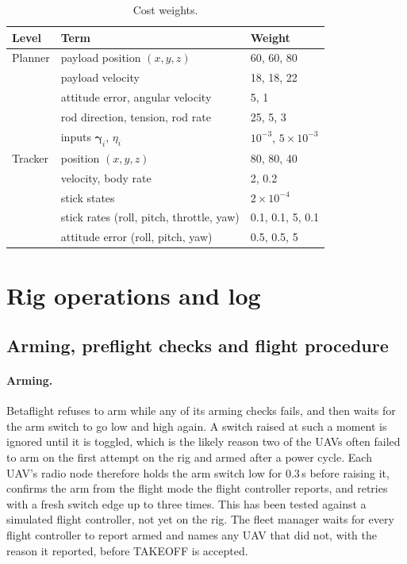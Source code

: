 \begin{table}[h]
\centering
\caption{Cost weights.}
\label{tab:weights}
\begin{tabular}{lll}
\toprule
Level & Term & Weight \\
\midrule
Planner & payload position $(x, y, z)$ & 60, 60, 80 \\
        & payload velocity & 18, 18, 22 \\
        & attitude error, angular velocity & 5, 1 \\
        & rod direction, tension, rod rate & 25, 5, 3 \\
        & inputs $\boldsymbol{\gamma}_i$, $\eta_i$ & $10^{-3}$, $5\times10^{-3}$ \\
\midrule
Tracker & position $(x, y, z)$ & 80, 80, 40 \\
        & velocity, body rate & 2, 0.2 \\
        & stick states & $2\times10^{-4}$ \\
        & stick rates (roll, pitch, throttle, yaw) & 0.1, 0.1, 5, 0.1 \\
        & attitude error (roll, pitch, yaw) & 0.5, 0.5, 5 \\
\bottomrule
\end{tabular}
\end{table}

\section{Rig operations and log}
\label{sec:app_rig}

\subsection{Arming, preflight checks and flight procedure}

\paragraph{Arming.} Betaflight refuses to arm while any of its arming checks fails, and then waits
for the arm switch to go low and high again. A switch raised at such a moment is ignored until it is
toggled, which is the likely reason two of the UAVs often failed to arm on the first attempt on the
rig and armed after a power cycle. Each UAV's radio node therefore holds the arm switch low for
0.3\,s before raising it, confirms the arm from the flight mode the flight controller reports, and
retries with a fresh switch edge up to three times. This has been tested against a simulated flight
controller, not yet on the rig. The fleet manager waits
for every flight controller to report armed and names any UAV that did not, with the reason it
reported, before TAKEOFF is accepted.

